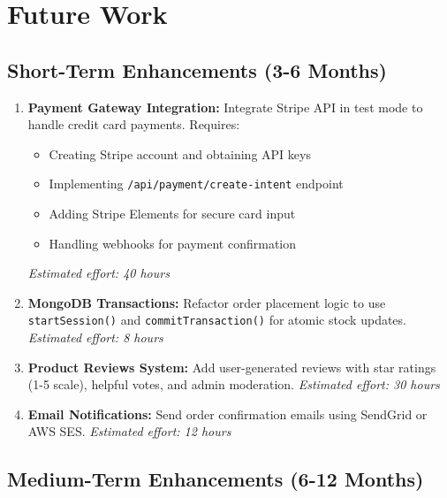 \section{Future Work}

\subsection{Short-Term Enhancements (3-6 Months)}

\begin{enumerate}
    \item \textbf{Payment Gateway Integration:} Integrate Stripe API in test mode to handle credit card payments. Requires:
    \begin{itemize}
        \item Creating Stripe account and obtaining API keys
        \item Implementing \texttt{/api/payment/create-intent} endpoint
        \item Adding Stripe Elements for secure card input
        \item Handling webhooks for payment confirmation
    \end{itemize}
    \textit{Estimated effort: 40 hours}
    
    \item \textbf{MongoDB Transactions:} Refactor order placement logic to use \texttt{startSession()} and \texttt{commitTransaction()} for atomic stock updates.
    \textit{Estimated effort: 8 hours}
    
    \item \textbf{Product Reviews System:} Add user-generated reviews with star ratings (1-5 scale), helpful votes, and admin moderation.
    \textit{Estimated effort: 30 hours}
    
    \item \textbf{Email Notifications:} Send order confirmation emails using SendGrid or AWS SES.
    \textit{Estimated effort: 12 hours}
\end{enumerate}

\subsection{Medium-Term Enhancements (6-12 Months)}

